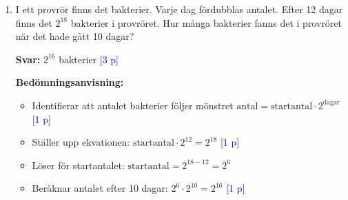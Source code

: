 \documentclass[12pt,a4paper]{article}
\newcommand{\points}[1]{\textcolor{blue}{[#1 p]}}
\begin{document}
\begin{enumerate}[label=\textbf{\arabic*.}]
        \textbf{Bedömningsanvisning:}
        \begin{itemize}
            \item Ställer upp ekvationer: Låt $K$ vara Khalebs ålder och $E$ vara Erikas ålder idag. \points{1}
            \item Första villkoret: $K + 20 = E$ \points{1}
            \item Andra villkoret: $E + 10 = 2(K + 10)$ \points{1}
            \item Löser ekvationssystemet: 
                \begin{align*}
                K + 20 &= E\\
                E + 10 &= 2(K + 10)\\
                E + 10 &= 2K + 20\\
                K + 20 + 10 &= 2K + 20\\
                K + 30 &= 2K + 20\\
                30 - 20 &= 2K - K\\
                10 &= K
                \end{align*}
                Vilket ger $K = 5$ och $E = 25$ \points{1}
        \end{itemize}
    
    \item I ett provrör finns det bakterier. Varje dag fördubblas antalet. Efter 12 dagar finns det $2^{18}$ bakterier i provröret. Hur många bakterier fanns det i provröret när det hade gått 10 dagar?
    
        \textbf{Svar:} $2^{16}$ bakterier \points{3}
        
        \textbf{Bedömningsanvisning:}
        \begin{itemize}
            \item Identifierar att antalet bakterier följer mönstret $\text{antal} = \text{startantal} \cdot 2^{\text{dagar}}$ \points{1}
            \item Ställer upp ekvationen: $\text{startantal} \cdot 2^{12} = 2^{18}$ \points{1}
            \item Löser för startantalet: $\text{startantal} = 2^{18-12} = 2^6$
            \item Beräknar antalet efter 10 dagar: $2^6 \cdot 2^{10} = 2^{16}$ \points{1}
        \end{itemize}

\end{enumerate}
\end{document}
